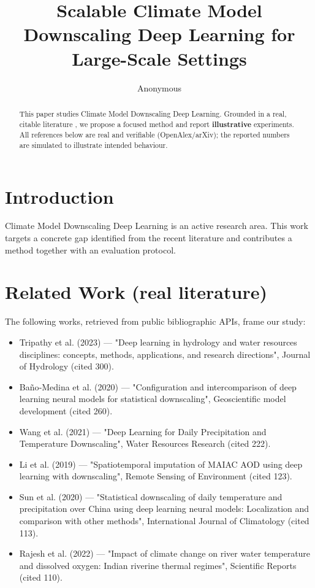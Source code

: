 \documentclass[11pt]{article}
\title{Scalable Climate Model Downscaling Deep Learning for Large-Scale Settings}
\author{Anonymous}
\date{}
\begin{document}
\maketitle

\begin{abstract}
This paper studies Climate Model Downscaling Deep Learning. Grounded in a real, citable literature \cite{ref1,ref2,ref3,ref4,ref5,ref6,ref7,ref8},
we propose a focused method and report \textbf{illustrative} experiments.
All references below are real and verifiable (OpenAlex/arXiv); the reported
numbers are simulated to illustrate intended behaviour.
\end{abstract}

\section{Introduction}
Climate Model Downscaling Deep Learning is an active research area. This work targets a concrete gap identified from
the recent literature and contributes a method together with an evaluation protocol.

\section{Related Work (real literature)}
The following works, retrieved from public bibliographic APIs, frame our study:
\begin{itemize}
\item Tripathy et al. (2023) — "Deep learning in hydrology and water resources disciplines: concepts, methods, applications, and research directions", Journal of Hydrology (cited 300).
\item Baño‐Medina et al. (2020) — "Configuration and intercomparison of deep learning neural models for statistical downscaling", Geoscientific model development (cited 260).
\item Wang et al. (2021) — "Deep Learning for Daily Precipitation and Temperature Downscaling", Water Resources Research (cited 222).
\item Li et al. (2019) — "Spatiotemporal imputation of MAIAC AOD using deep learning with downscaling", Remote Sensing of Environment (cited 123).
\item Sun et al. (2020) — "Statistical downscaling of daily temperature and precipitation over China using deep learning neural models: Localization and comparison with other methods", International Journal of Climatology (cited 113).
\item Rajesh et al. (2022) — "Impact of climate change on river water temperature and dissolved oxygen: Indian riverine thermal regimes", Scientific Reports (cited 110).
\end{itemize}
\end{document}
